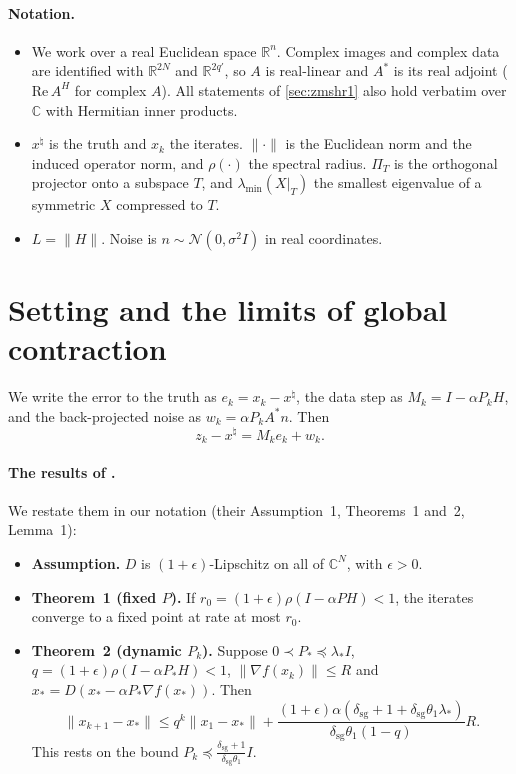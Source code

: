 \documentclass[11pt]{article}
\theoremstyle{definition}
\theoremstyle{remark}
\newcommand{\RR}{\mathbb R}
\newcommand{\CC}{\mathbb C}
\newcommand{\norm}[1]{\lVert #1\rVert}
\newcommand{\lmin}{\lambda_{\min}}
\newcommand{\dsg}{\delta_{\mathrm{sg}}}
\newcommand{\xt}{x^\natural}
\begin{document}
\paragraph{Notation.}
\begin{itemize}
\item We work over a real Euclidean space $\RR^n$. Complex images and complex data are identified with
  $\RR^{2N}$ and $\RR^{2q'}$, so $A$ is real-linear and $A^*$ is its real adjoint ($\mathrm{Re}\,A^H$ for complex
  $A$). All statements of \cref{sec:zmshr1} also hold verbatim over $\CC$ with Hermitian inner products.
\item $\xt$ is the truth and $x_k$ the iterates. $\norm{\cdot}$ is the Euclidean norm and the induced operator norm, and $\rho(\cdot)$ the spectral radius.
  $\Pi_T$ is the orthogonal projector onto a subspace $T$, and $\lmin(X|_T)$ the smallest eigenvalue of a
  symmetric $X$ compressed to $T$.
\item $L=\norm{H}$. Noise is $n\sim\mathcal N(0,\sigma^2I)$ in real coordinates.
\end{itemize}

\section{Setting and the limits of global contraction}\label{sec:setting}

We write the error to the truth as $e_k=x_k-\xt$, the data step as $M_k=I-\alpha P_kH$, and the back-projected
noise as $w_k=\alpha P_kA^*n$. Then
\begin{equation}\label{eq:zerr}
  z_k-\xt=M_ke_k+w_k .
\end{equation}

\paragraph{The results of \cite{hong2024p2np}.} We restate them in our notation (their Assumption~1, Theorems~1
and~2, Lemma~1):
\begin{itemize}
\item \textbf{Assumption.} $D$ is $(1+\epsilon)$-Lipschitz on all of $\CC^N$, with $\epsilon>0$.
\item \textbf{Theorem~1 (fixed $P$).} If $r_0=(1+\epsilon)\rho(I-\alpha PH)<1$, the iterates converge to a fixed
  point at rate at most $r_0$.
\item \textbf{Theorem~2 (dynamic $P_k$).} Suppose $0\prec P_*\preceq\lambda_*I$, $q=(1+\epsilon)\rho(I-\alpha P_*H)<1$,
  $\norm{\nabla f(x_k)}\leq R$ and $x_*=D(x_*-\alpha P_*\nabla f(x_*))$. Then
  \[
  \norm{x_{k+1}-x_*}\leq q^k\norm{x_1-x_*}+\frac{(1+\epsilon)\alpha(\dsg+1+\dsg\theta_1\lambda_*)}{\dsg\theta_1(1-q)}R .
  \]
  This rests on the bound $P_k\preceq\frac{\dsg+1}{\dsg\theta_1}I$.
\end{itemize}
\end{document}
